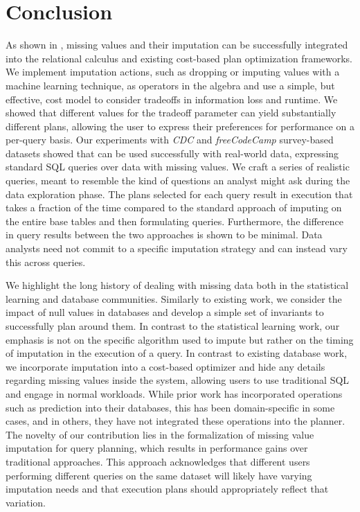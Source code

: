 \section{Conclusion}
As shown in \ProjectName{}, missing values and their imputation can be successfully integrated into the relational calculus and
existing cost-based plan optimization frameworks. We implement imputation actions, such as dropping or imputing values with a machine
learning technique, as operators in the algebra and use a simple, but effective, cost model to consider tradeoffs in 
information loss and runtime. We showed that different values for the tradeoff parameter can yield substantially
different plans, allowing the user to express their preferences for performance on a per-query basis.
Our experiments with \textit{CDC} and \textit{freeCodeCamp} survey-based datasets
showed that \ProjectName{} can be used successfully with real-world data, expressing standard SQL queries over data with missing values. 
We craft a series of realistic queries, meant to resemble the kind of questions an analyst might ask during
the data exploration phase. The plans selected for each query result in execution that
takes a fraction of the time compared to the standard approach of imputing on the entire base tables and
then formulating queries. Furthermore, the difference in query results between the two approaches is
shown to be minimal. Data analysts need not commit to a specific imputation strategy and can instead
vary this across queries.

We highlight the long history of dealing with missing data both in the statistical learning and database communities.
Similarly to existing work, we consider the impact of null values in databases and develop a simple set of invariants to 
successfully plan around them. In contrast to the statistical learning work, our emphasis is not on the specific algorithm
used to impute but rather on the timing of imputation in the execution of a query. In contrast to existing database work,
we incorporate imputation into a cost-based optimizer and hide any details
regarding missing values inside the system, allowing users to use traditional SQL and engage in normal workloads.
While prior work has incorporated operations such as prediction into their databases, this has been domain-specific
in some cases, and in others, they have not integrated these operations into the planner. The novelty
of our contribution lies in the formalization of missing value imputation for query planning, which results in performance
gains over traditional approaches. This approach acknowledges that different users performing different queries on the same
dataset will likely have varying imputation needs and that execution plans should appropriately reflect that variation.

